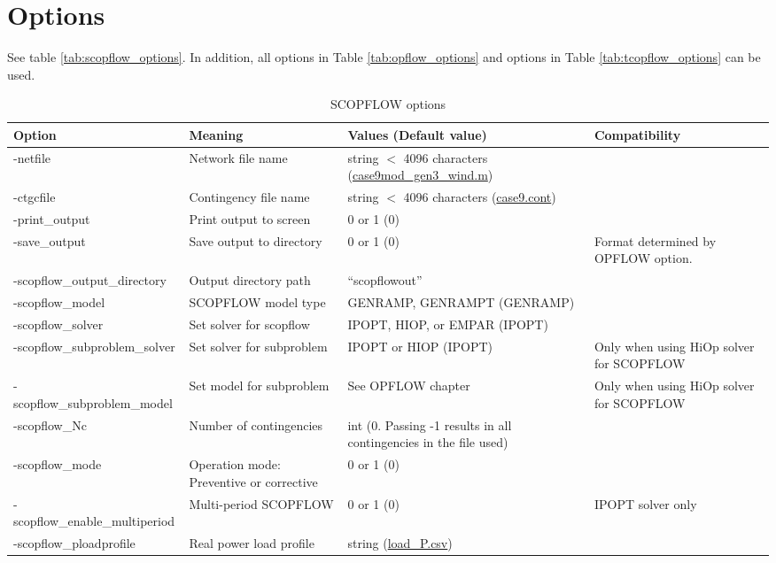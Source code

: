 \section{Options}
See table \ref{tab:scopflow_options}. In addition, all \opflow options in Table \ref{tab:opflow_options} and \tcopflow options in Table \ref{tab:tcopflow_options} can be used.
\begin{table}[H]
  \caption{SCOPFLOW options}
  \small
  \begin{tabular}{|p{}|p{}|p{}|p{}|}
    \hline
    \textbf{Option} & \textbf{Meaning} & \textbf{Values (Default value)} & \textbf{Compatibility} \\ \hline
    -netfile & Network file name & string $<$ 4096 characters (\href{https://github.com/ORNL/ExaGO/tree/develop/datafiles/case9/case9mod_gen3_wind.m}{case9mod\_gen3\_wind.m}) &\\ \hline
    -ctgcfile & Contingency file name & string $<$ 4096 characters (\href{https://github.com/ORNL/ExaGO/tree/develop/datafiles/case9/case9.cont}{case9.cont}) &\\ \hline
    -print\_output & Print output to screen & 0 or 1 (0) &\\ \hline
    -save\_output & Save output to directory & 0 or 1 (0) & Format determined by OPFLOW option. \\ \hline
    -scopflow\_output\_directory & Output directory path & ``scopflowout'' & \\ \hline
    -scopflow\_model & SCOPFLOW model type & GENRAMP, GENRAMPT (GENRAMP) & \\ \hline
    -scopflow\_solver & Set solver for scopflow & IPOPT, HIOP, or EMPAR (IPOPT) &\\ \hline
    -scopflow\_subproblem\_solver & Set solver for subproblem & IPOPT or HIOP (IPOPT) &Only when using HiOp solver for SCOPFLOW \\ \hline
    -scopflow\_subproblem\_model & Set model for subproblem & See OPFLOW chapter &Only when using HiOp solver for SCOPFLOW \\ \hline
    -scopflow\_Nc & Number of contingencies & int (0. Passing -1 results in all contingencies in the file used) &\\ \hline
    -scopflow\_mode & Operation mode: Preventive or corrective & 0 or 1 (0) &\\ \hline
    -scopflow\_enable\_multiperiod & Multi-period SCOPFLOW & 0 or 1 (0) & IPOPT solver only\\ \hline
    -scopflow\_ploadprofile & Real power load profile & string (\href{https://github.com/ORNL/ExaGO/tree/develop/datafiles/case9/load_P.csv}{load\_P.csv}) &\\ \hline

\end{tabular}
\end{table}
